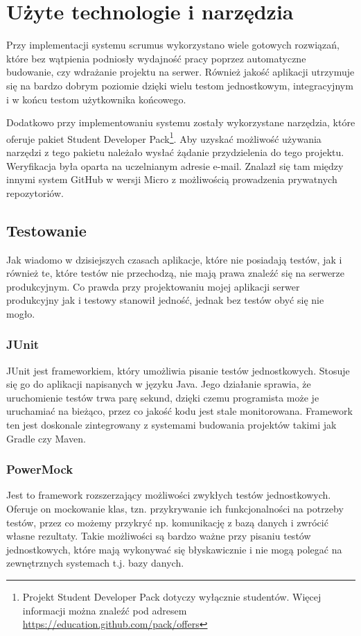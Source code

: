 \section{Użyte technologie i narzędzia}
Przy implementacji systemu scrumus wykorzystano wiele gotowych rozwiązań, które bez wątpienia podniosły wydajność pracy poprzez automatyczne budowanie, czy wdrażanie projektu na serwer. Również jakość aplikacji utrzymuje się na bardzo dobrym poziomie dzięki wielu testom jednostkowym, integracyjnym i w końcu testom użytkownika końcowego. 

Dodatkowo przy implementowaniu systemu zostały wykorzystane narzędzia, które oferuje pakiet Student Developer Pack\footnote{Projekt Student Developer Pack dotyczy wyłącznie studentów. Więcej informacji można znaleźć pod adresem \url{https://education.github.com/pack/offers}}. Aby uzyskać możliwość używania narzędzi z tego pakietu należało wysłać żądanie przydzielenia do tego projektu. Weryfikacja była oparta na uczelnianym adresie e-mail. Znalazł się tam między innymi system GitHub w wersji Micro z możliwością prowadzenia prywatnych repozytoriów.

\subsection{Testowanie}
Jak wiadomo w dzisiejszych czasach aplikacje, które nie posiadają testów, jak i również te, które testów nie przechodzą, nie mają prawa znaleźć się na serwerze produkcyjnym. Co prawda przy projektowaniu mojej aplikacji serwer produkcyjny jak i testowy stanowił jedność, jednak bez testów obyć się nie mogło.

\subsubsection{JUnit}
JUnit jest frameworkiem, który umożliwia pisanie testów jednostkowych. Stosuje się go do aplikacji napisanych w języku Java. Jego działanie sprawia, że uruchomienie testów trwa parę sekund, dzięki czemu programista może je uruchamiać na bieżąco, przez co jakość kodu jest stale monitorowana. Framework ten jest doskonale zintegrowany z systemami budowania projektów takimi jak Gradle czy Maven. 

\subsubsection{PowerMock}
Jest to framework rozszerzający możliwości zwykłych testów jednostkowych. Oferuje on mockowanie klas, tzn. przykrywanie ich funkcjonalności na potrzeby testów, przez co możemy przykryć np. komunikację z bazą danych i zwrócić własne rezultaty. Takie możliwości są bardzo ważne przy pisaniu testów jednostkowych, które mają wykonywać się błyskawicznie i nie mogą polegać na zewnętrznych systemach t.j. bazy danych.

